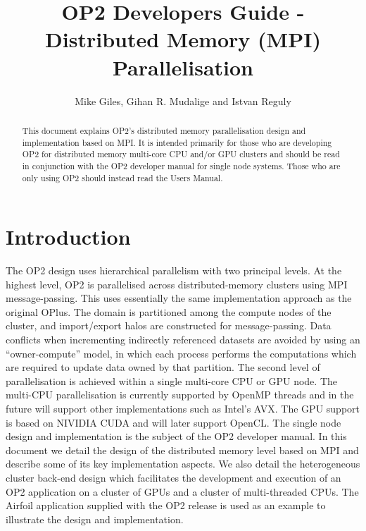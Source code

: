 \documentclass[11pt]{article}
\begin{document}
\title{OP2 Developers Guide - Distributed Memory (MPI) Parallelisation}
\author{Mike Giles, Gihan R. Mudalige and Istvan Reguly}

\maketitle

\begin{abstract}
\noindent This document explains OP2's distributed memory parallelisation design and implementation based on MPI.  It is
intended primarily for those who are developing OP2 for distributed memory multi-core CPU and/or GPU clusters and
should be read in conjunction with the OP2 developer manual for single node systems. Those who are only using OP2 should
instead read the Users Manual.
\end{abstract}

\newpage




\tableofcontents

\newpage

\section{Introduction}
The OP2 design uses hierarchical parallelism with two principal levels. At the highest level, OP2 is parallelised across
distributed-memory clusters using MPI message-passing.  This uses essentially the same implementation approach as the
original OPlus\cite{oplus}. The domain is partitioned among the compute nodes of the cluster, and import/export halos
are
constructed for message-passing. Data conflicts when  incrementing indirectly referenced datasets are avoided by
using an ``owner-compute'' model, in which each process performs the computations which are required to update data
owned by that partition. The second level of parallelisation is achieved within a single multi-core CPU or
GPU node. The multi-CPU parallelisation is currently supported by OpenMP threads and in the future will support other
implementations such as Intel's AVX. The GPU support is based on NIVIDIA CUDA and will later support OpenCL. The single
node design and implementation is the subject of the OP2 developer manual. In this document we detail the design of the
distributed memory level based on MPI and describe some of its key implementation aspects. We also detail the
heterogeneous cluster back-end design which facilitates the development and execution of an OP2 application on a cluster
of GPUs and a cluster of multi-threaded CPUs. The Airfoil application supplied with the OP2 release is used as an
example to illustrate the design and implementation.
\end{document}
